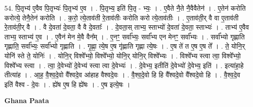 \documentclass[17pt]{extarticle}
\begin{document}
54. पि॒तृभ्य॑ ए॒वैव पि॒तृभ्यः॑ पि॒तृभ्य॑ ए॒व । . पि॒तृभ्य॒ इति॑ पि॒तृ - भ्यः॒ । . ए॒वैते नै॒ते नै॒वैवैतेन॑ । . ए॒तेन॑ करोति करोत्ये॒ तेनै॒तेन॑ करोति । . क॒रो॒ त्ये॒ताव॑ती रे॒ताव॑तीः करोति करो त्ये॒ताव॑तीः । . ए॒ताव॑ती॒र् वै वा ए॒ताव॑ती रे॒ताव॑ती॒र् वै । . वै दे॒वता॑ दे॒वता॒ वै वै दे॒वताः᳚ । . दे॒वता॒स् ताभ्य॒ स्ताभ्यो॑ दे॒वता॑ दे॒वता॒ स्ताभ्यः॑ । . ताभ्य॑ ए॒वैव ताभ्य॒ स्ताभ्य॑ ए॒व । . ए॒वैन॑ मेन मे॒वै वैन᳚म् । . ए॒नꣳ॒॒ सर्वा᳚भ्यः॒ सर्वा᳚भ्य एन मेनꣳ॒॒ सर्वा᳚भ्यः । . सर्वा᳚भ्यो गृह्णाति गृह्णाति॒ सर्वा᳚भ्यः॒ सर्वा᳚भ्यो गृह्णाति । . गृ॒ह्णा॒ त्ये॒ष ए॒ष गृ॑ह्णाति गृह्णा त्ये॒षः । . ए॒ष ते॑ त ए॒ष ए॒ष ते᳚ । . ते॒ योनि॒र् योनि॑ स्ते ते॒ योनिः॑ । . योनि॒र् विश्वे᳚भ्यो॒ विश्वे᳚भ्यो॒ योनि॒र् योनि॒र् विश्वे᳚भ्यः । . विश्वे᳚भ्य स्त्वा त्वा॒ विश्वे᳚भ्यो॒ विश्वे᳚भ्य स्त्वा । . त्वा॒ दे॒वेभ्यो॑ दे॒वेभ्य॑ स्त्वा त्वा दे॒वेभ्यः॑ । . दे॒वेभ्य॒ इतीति॑ दे॒वेभ्यो॑ दे॒वेभ्य॒ इति॑ । . इत्या॑हा॒हे तीत्या॑ह । . आ॒ह॒ वै॒श्व॒दे॒वो वै᳚श्वदे॒व आ॑हाह वैश्वदे॒वः । . वै॒श्व॒दे॒वो हि हि वै᳚श्वदे॒वो वै᳚श्वदे॒वो हि । . वै॒श्व॒दे॒व इति॑ वैश्व - दे॒वः । . ह्ये॑ष ए॒ष हि ह्ये॑षः । . ए॒ष इत्ये॒षः । \newline

\textbf{Ghana Paata } \newline
\end{document}
